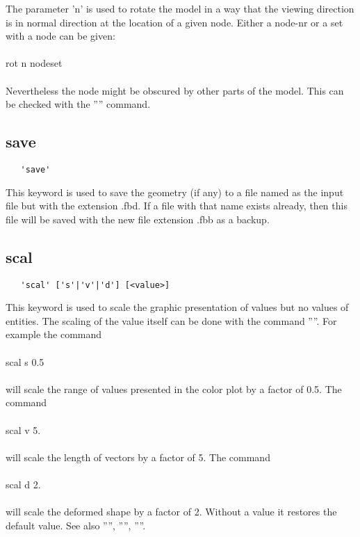 \documentclass{article}
\begin{document}
The parameter 'n' is used to rotate the model in a way that the viewing direction is in normal direction at the location of a given node. Either a node-nr or a set with a node can be given:\\\\rot n nodeset\\\\Nevertheless the node might be obscured by other parts of the model. This can be checked with the '''' command.

\subsection{\label{save}save}
\begin{verbatim}
   'save' 
\end{verbatim}
This keyword is used to save the geometry (if any) to a file named as the input file but with the extension .fbd. If a file with that name exists already, then this file will be saved with the new file extension .fbb as a backup.
 
\subsection{\label{scal}scal}
\begin{verbatim}
   'scal' ['s'|'v'|'d'] [<value>]
\end{verbatim}
This keyword is used to scale the graphic presentation of values but no values of entities. The scaling of the value itself can be done with the command ''''. For example the command\\\\scal s 0.5\\\\will scale the range of values presented in the color plot by a factor of 0.5. The command\\\\scal v 5.\\\\will scale the length of vectors by a factor of 5. The command\\\\scal d 2.\\\\will scale the deformed shape by a factor of 2. Without a value it restores the default value. See also '''', '''', ''''.
\end{document}
